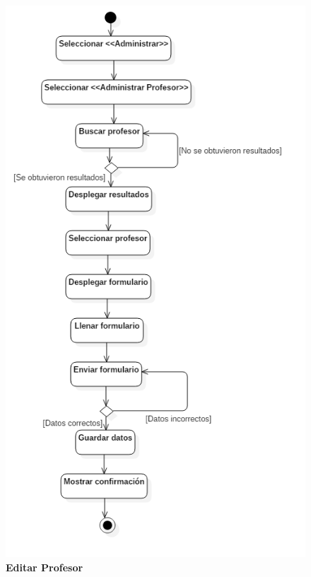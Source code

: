 \begin{figure}[H]
  \centering
    \includegraphics[scale=.8,angle=0]{project/Actividades/editar_profesor.png}
  \caption{\textbf{Editar Profesor}}
\end{figure}
